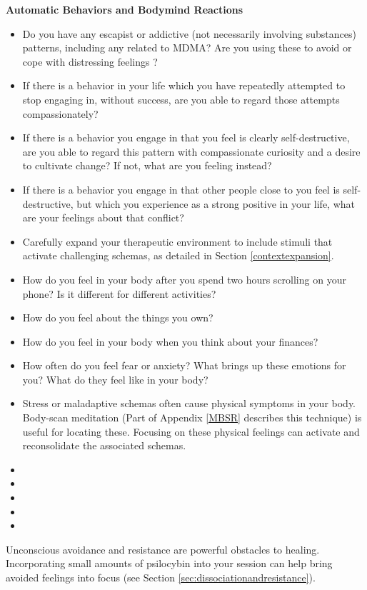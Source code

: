 \documentclass[12pt,letterpaper]{article}
\begin{document}
\noindent \textbf{Automatic Behaviors and Bodymind Reactions}
\begin{itemize}
    \item Do you have any escapist or addictive (not necessarily involving substances) patterns, including any related to MDMA? Are you using these to avoid or cope with distressing feelings \cite{forsterTraumaAddiction,alaviBehavioralAddiction}?
    \item If there is a behavior in your life which you have repeatedly attempted to stop engaging in, without success, are you able to regard those attempts compassionately?
    \item If there is a behavior you engage in that you feel is clearly self-destructive, are you able to regard this pattern with compassionate curiosity and a desire to cultivate change? If not, what are you feeling instead?
    \item If there is a behavior you engage in that other people close to you feel is self-destructive, but which you experience as a strong positive in your life, what are your feelings about that conflict?
    \item Carefully expand your therapeutic environment to include stimuli that activate challenging schemas, as detailed in Section \ref{contextexpansion}.
    \item How do you feel in your body after you spend two hours scrolling on your phone? Is it different for different activities?
    \item How do you feel about the things you own?
    \item How do you feel in your body when you think about your finances?
    \item How often do you feel fear or anxiety? What brings up these emotions for you? What do they feel like in your body?
    \item Stress or maladaptive schemas often cause physical symptoms in your body. Body-scan meditation (Part of Appendix \ref{MBSR} describes this technique) is useful for locating these. Focusing on these physical feelings can activate and reconsolidate the associated schemas.
\end{itemize}

\begin{itemize}
    \item {}
    \item {}
    \item {}
    \item {}
    \item {}
\end{itemize}
Unconscious avoidance and resistance are powerful obstacles to healing. Incorporating small amounts of psilocybin into your session can help bring avoided feelings into focus (see Section \ref{sec:dissociationandresistance}). 
\end{document}
